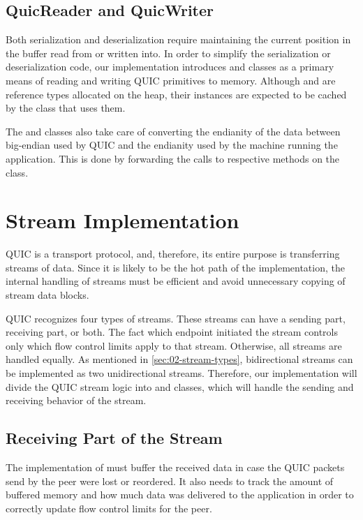 \subsection{QuicReader and QuicWriter}

Both serialization and deserialization require maintaining the current position in the buffer read
from or written into. In order to simplify the serialization or deserialization code, our
implementation introduces \QuicReader{} and \QuicWriter{} classes as a primary means of reading and
writing QUIC primitives to memory. Although \QuicReader{} and \QuicWriter{} are reference types
allocated on the heap, their instances are expected to be cached by the class that uses them.

The \QuicReader{} and \QuicWriter{} classes also take care of converting the endianity of the data
between big-endian used by QUIC and the endianity used by the machine running the application. This
is done by forwarding the calls to respective methods on the  class.

\section{Stream Implementation}\label{sec:03-stream-implementation}

QUIC is a transport protocol, and, therefore, its entire purpose is transferring streams of data.
Since it is likely to be the hot path of the implementation, the internal handling of streams must
be efficient and avoid unnecessary copying of stream data blocks.

QUIC recognizes four types of streams. These streams can have a sending part, receiving part, or
both. The fact which endpoint initiated the stream controls only which flow control limits apply to
that stream. Otherwise, all streams are handled equally. As mentioned in
\autoref{sec:02-stream-types}, bidirectional streams can be implemented as two unidirectional
streams. Therefore, our implementation will divide the QUIC stream logic into \SendStream{} and
\ReceiveStream{} classes, which will handle the sending and receiving behavior of the stream.

\subsection{Receiving Part of the Stream}\label{sec:03-receive-stream}

The implementation of \ReceiveStream{} must buffer the received data in case the QUIC packets send
by the peer were lost or reordered. It also needs to track the amount of buffered memory and how
much data was delivered to the application in order to correctly update flow control limits for the
peer.


